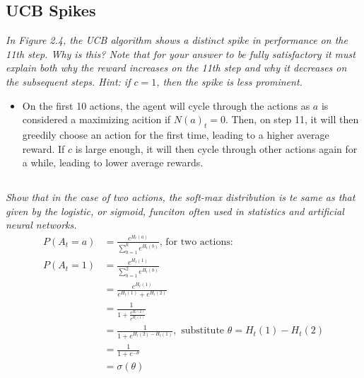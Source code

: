 \documentclass{article}
\begin{document}
\subsection{UCB Spikes}
\textit{In Figure 2.4, the UCB algorithm shows a distinct spike in performance on the 11th step. Why is this? Note that for your answer to be fully satisfactory it must explain both why the reward increases on the 11th step and why it decreases on the subsequent steps. Hint: if $c=1$, then the spike is less prominent.}
\begin{itemize}
\item On the first 10 actions, the agent will cycle through the actions as $a$ is considered a maximizing acition if $N(a)_t = 0$. Then, on step 11, it will then greedily choose an action for the first time, leading to a higher average reward. If $c$ is large enough, it will then cycle through other actions again for a while, leading to lower average rewards.
\end{itemize}


\subsection{}
\textit{Show that in the case of two actions, the soft-max distribution is te same as that given by the logistic, or sigmoid, funciton often used in statistics and artificial neural networks.}
\begin{align}
P(A_t = a) &= \frac{e^{H_t (a)}}{\sum_{b=1}^k e^{H_t(b)}} \text{, for two actions: } \\
P(A_t=1) &= \frac{e^{H_t (1)}}{\sum_{b=1}^2 e^{H_t(b)}} \\
 &= \frac{e^{H_t(1)}}{e^{H_t(1)} + e^{H_t(2)}} \\
 &= \frac{1}{1 + \frac{e^{H_t(2)}}{e^{H_t(1)}}} \\
 &= \frac{1}{1 + e^{H_t(2) - H_t(1)}}, \text{ substitute } \theta = H_t(1) - H_t(2) \\
 &= \frac{1}{1 + e^{-\theta}} \\
 &= \sigma (\theta)
\end{align}
\end{document}
